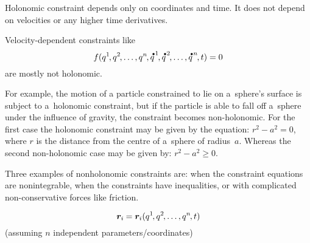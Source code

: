 Holonomic constraint depends only on coordinates and time.
It does not depend on velocities or any higher time derivatives.

Velocity-dependent constraints like
\[
f(q^{1} \hspace{-0.25ex}, q^{2} \hspace{-0.25ex}, \ldots, q^{n} \hspace{-0.25ex}, {\mathdotabove{q}}^{\hspace{.2ex}1} \hspace{-0.25ex}, {\mathdotabove{q}}^{\hspace{.2ex}2} \hspace{-0.25ex}, \ldots, {\mathdotabove{q}}^{\hspace{.2ex}n} \hspace{-0.25ex}, t) = 0
\]
are mostly not holonomic.

For example, the motion of a particle constrained to lie on a~sphere’s surface is subject to a~holonomic constraint, but if the particle is able to fall off a~sphere under the influence of gravity, the constraint becomes non-holonomic.
For the first case the holonomic constraint may be given by the equation: ${r^{2} - a^{2} = 0}$, where $r$ is the distance from the centre of a~sphere of radius~$a$.
Whereas the second non-holonomic case may be given by: ${r^{2} - a^{2} \geq 0}$.

Three examples of nonholonomic constraints are: when the constraint equations are nonintegrable, when the constraints have inequalities, or with complicated non-conservative forces like friction.

\[
\bm{r}_{i} \hspace{-0.1ex} = \bm{r}_{i}(q^{1} \hspace{-0.25ex}, q^{2} \hspace{-0.25ex}, \ldots, q^{n} \hspace{-0.25ex}, t)
\]
(assuming $n$ independent parameters/coordinates)



\label{section:virtualworkprinciple.genericmechanics}


